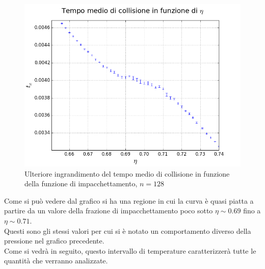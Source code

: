 \begin{figure}[h!]
	\centering
	\includegraphics[scale=0.48]{sfere2D/tczoomzoom.png}
	\caption{Ulteriore ingrandimento del tempo medio di collisione in funzione della funzione di impacchettamento, $n=128$}
	\end{figure}



Come si può vedere dal grafico si ha una regione in cui la curva è quasi piatta a partire da un valore della frazione di impacchettamento poco sotto $\eta \sim 0.69$ fino a $\eta \sim 0.71$.\\
Questi sono gli stessi valori per cui si è notato un comportamento diverso della pressione nel grafico precedente.\\
Come si vedrà in seguito, questo intervallo di temperature caratterizzerà tutte le quantità che verranno analizzate.
 
